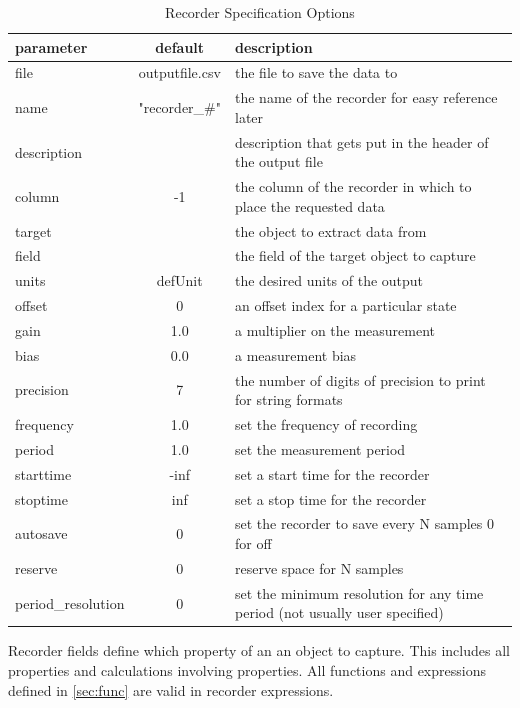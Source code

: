 \documentclass[12pt]{article} %
\begin{document}
 \begin{table}[ht]
 	
 	\caption{Recorder Specification Options} %
 	\centering %
 	\begin{tabular}{l c p{8cm}} %
 		\hline %
 		parameter & default & description \\ [0.5ex] %
 		\hline %
 		file & outputfile.csv & the file to save the data to \\ %
 		name  & "recorder\_\#" & the name of the recorder for easy reference later \\
 		description & & description that gets put in the header of the output file \\
 		column & -1 & the column of the recorder in which to place the requested data  \\
 	    target  &  & the object to extract data from\\
 		field &  & the field of the target object to capture \\
 		units  & defUnit & the desired units of the output \\%
 		offset & 0 & an offset index for a particular state \\
 		gain & 1.0  & a multiplier on the measurement \\
 		bias  & 0.0 & a measurement bias \\
 		precision& 7 & the number of digits of precision to print for string formats \\
 		frequency & 1.0 & set the frequency of recording \\
 		period  & 1.0 & set the measurement period \\
 		starttime & -inf & set a start time for the recorder \\
 		stoptime & inf & set a stop time for the recorder \\
 		autosave  & 0 & set the recorder to save every N samples 0 for off \\ 
 		reserve& 0 & reserve space for N samples \\
 		period\_resolution & 0 & set the minimum resolution for any time period (not usually user specified) \\
 				\hline %
 	\end{tabular}
 	\label{Table:recorderOptions}
 \end{table} 
 Recorder fields define which property of an an object to capture.  This includes all properties and calculations involving properties.  All functions and expressions defined in \ref{sec:func} are valid in recorder expressions.  
 
\end{document}
